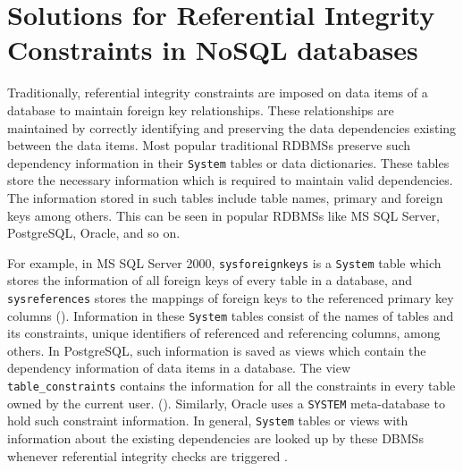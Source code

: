\chapter{Solutions for Referential Integrity Constraints in NoSQL
databases}
\label{c:solutions}

Traditionally, referential
integrity constraints are imposed on data items of a database to maintain
foreign key relationships. These relationships are
 maintained by correctly identifying and preserving the data dependencies 
 existing between the data items.
Most popular traditional \acp{RDBMS}
preserve such dependency information in their \texttt{System} tables or data
dictionaries.  These tables store the necessary information  which is required
to maintain valid dependencies. The information stored in such tables include table
names,  primary and foreign keys among others.
This can be seen in popular \acp{RDBMS} like  MS SQL Server,  PostgreSQL,
Oracle, and so on.  

For example,  in MS SQL Server 2000, \texttt{sysforeignkeys}
is a \texttt{System} table which stores the information of all 
foreign keys of every table in a database, and \texttt{sysreferences}
stores the mappings of  foreign keys to the referenced primary key columns
().
Information in these \texttt{System} tables consist of  the
names of tables and its constraints,  unique identifiers of 
referenced and referencing columns,  among others. 
In PostgreSQL, such information is saved as views which contain the dependency
information of data items in a database.
The view \texttt{table\_constraints} contains the information for all the
constraints in every table owned by the current user. (\todo{\cite{}}). 
Similarly, Oracle uses a \texttt{SYSTEM} meta-database to hold such constraint
information.
 In general, \texttt{System} tables or views with information
about the existing dependencies  are looked up by these \acp{DBMS} whenever
referential integrity checks are triggered \citep{sys:msdn}.


